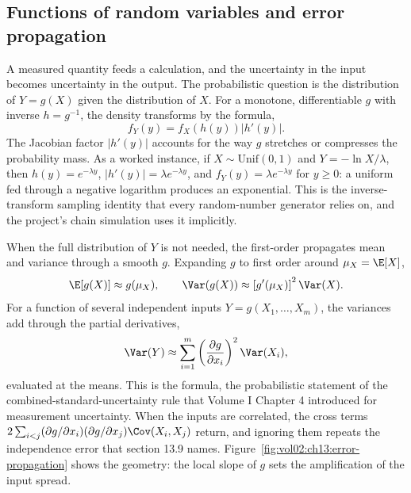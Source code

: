 \subsection{Functions of random variables and error propagation}

A measured quantity feeds a calculation, and the uncertainty in the
input becomes uncertainty in the output. The probabilistic question
is the distribution of $Y = g(X)$ given the distribution of $X$.
For a monotone, differentiable $g$ with inverse $h = g^{-1}$, the
density transforms by the  formula,
\[
f_{Y}(y) = f_{X}(h(y)) \left| h'(y) \right|.
\]
The Jacobian factor $|h'(y)|$ accounts for the way $g$ stretches or
compresses the probability mass. As a worked instance, if
$X \sim \mathrm{Unif}(0, 1)$ and $Y = -\ln X / \lambda$, then
$h(y) = e^{-\lambda y}$, $|h'(y)| = \lambda e^{-\lambda y}$, and
$f_{Y}(y) = \lambda e^{-\lambda y}$ for $y \geq 0$: a uniform fed
through a negative logarithm produces an exponential. This is the
inverse-transform sampling identity that every random-number
generator relies on, and the project's chain simulation uses it
implicitly.

When the full distribution of $Y$ is not needed, the first-order
 propagates mean and variance through a
smooth $g$. Expanding $g$ to first order around $\mu_{X} = \E[X]$,
\[
\E[g(X)] \approx g(\mu_{X}), \qquad
\Var(g(X)) \approx \left[ g'(\mu_{X}) \right]^{2} \Var(X).
\]
For a function of several independent inputs $Y = g(X_{1}, \ldots,
X_{m})$, the variances add through the partial derivatives,
\[
\Var(Y) \approx \sum_{i=1}^{m}
\left( \frac{\partial g}{\partial x_{i}} \right)^{2}
\Var(X_{i}),
\]
evaluated at the means. This is the  formula, the probabilistic statement of the
combined-standard-uncertainty rule that Volume I Chapter 4
introduced for measurement uncertainty. When the inputs are
correlated, the cross terms $2 \sum_{i < j} (\partial g /
\partial x_{i})(\partial g / \partial x_{j}) \Cov(X_{i}, X_{j})$
return, and ignoring them repeats the independence error that
section 13.9 names.
Figure~\ref{fig:vol02:ch13:error-propagation} shows the geometry:
the local slope of $g$ sets the amplification of the input spread.



